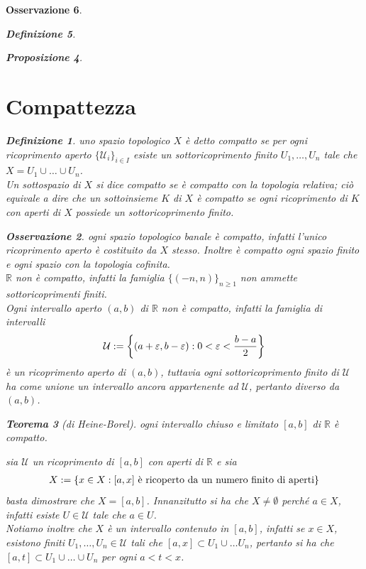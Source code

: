 \documentclass[oneside, 11pt]{amsbook}
\makeatletter
\newcommand{\0}{{(0)}}
\newcommand{\3}{{(3)}}
\theoremstyle{colonplain}
\newtheorem{thm}{Teorema}[chapter]
\newtheorem{prop}[thm]{Proposizione}
\theoremstyle{colondefinition}
\newtheorem{defn}[thm]{Definizione}
\theoremstyle{colonremark}
\newtheorem{rmk}[thm]{Osservazione}
\numberwithin{equation}{chapter}
\renewcommand{\proofname}{Dimostrazione}
\renewenvironment{proof}[1][\proofname]{\par
  \pushQED{\end{proof}}%
  \normalfont \topsep6\p@\@plus6\p@\relax
  \trivlist
  \item[\hskip\labelsep\bfseries #1:]\ignorespaces
}{%
  \popQED\endtrivlist\@endpefalse
}
\makeatother
\begin{document}
\begin{rmk}
\begin{defn}
\begin{prop}
\section{Compattezza}
\begin{defn}
uno spazio topologico $X$ è detto compatto se per ogni \textit{ricoprimento aperto} $\{ \mathcal{U}_i \}_{i \in I}$ esiste un \textit{sottoricoprimento finito} $U_1, \dots, U_n$ tale che $X = U_1 \cup \dots \cup U_n$. \\
Un sottospazio di $X$ si dice compatto se è compatto con la topologia relativa; ciò equivale a dire che un sottoinsieme $K$ di $X$ è compatto se ogni ricoprimento di $K$ con aperti di $X$ possiede un sottoricoprimento finito.
\end{defn}
\begin{rmk}
ogni spazio topologico banale è compatto, infatti l'unico ricoprimento aperto è costituito da $X$ stesso. Inoltre è compatto ogni spazio finito e ogni spazio con la topologia cofinita. \\
$\mathbb{R}$ non è compatto, infatti la famiglia $\{ (-n, n) \}_{n \geq 1}$ non ammette sottoricoprimenti finiti. \\
Ogni intervallo aperto $(a, b)$ di $\mathbb{R}$ non è compatto, infatti la famiglia di intervalli
\begin{align}
    \mathcal{U} := \left\{ (a + \varepsilon, b - \varepsilon) : 0 < \varepsilon < \frac{b - a}{2} \right\} \notag
\end{align}
è un ricoprimento aperto di $(a, b)$, tuttavia ogni sottoricoprimento finito di $\mathcal{U}$ ha come unione un intervallo ancora appartenente ad $\mathcal{U}$, pertanto diverso da $(a, b)$.
\end{rmk}
\begin{thm}[di Heine-Borel]
ogni intervallo chiuso e limitato $[a, b]$ di $\mathbb{R}$ è compatto.
\end{thm}
\begin{proof}
sia $\mathcal{U}$ un ricoprimento di $[a, b]$ con aperti di $\mathbb{R}$ e sia
\begin{align}
    X := \{ x \in X : [a, x] \text{ è ricoperto da un numero finito di aperti} \} \notag
\end{align}
basta dimostrare che $X = [a, b]$. Innanzitutto si ha che $X \neq \emptyset$ perché $a \in X$, infatti esiste $U \in \mathcal{U}$ tale che $a \in U$. \\
Notiamo inoltre che $X$ è un intervallo contenuto in $[a, b]$, infatti se $x \in X$, esistono finiti $U_1, \dots, U_n \in \mathcal{U}$ tali che $[a, x] \subset U_1 \cup \dots U_n$, pertanto si ha che $[a, t] \subset U_1 \cup \dots \cup U_n$ per ogni $a < t < x$. \\

\end{proof}
\end{prop}
\end{defn}
\end{rmk}
\end{document}
